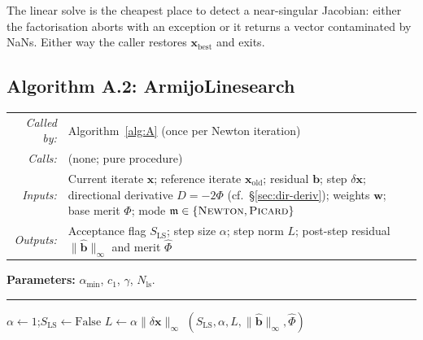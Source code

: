 \documentclass{article}
\makeatletter
\newcommand{\moduleinterface}[4]{%
\begin{interfacecard}
\footnotesize
\begin{tabular}{@{}r@{\quad}p{0.82\textwidth}@{}}
\textit{Called by:} & #1 \\
\textit{Calls:}     & #2 \\
\textit{Inputs:}    & #3 \\
\textit{Outputs:}   & #4 \\
\end{tabular}
\end{interfacecard}
}
\makeatother
\begin{document}
The linear solve is the cheapest place to detect a near-singular
Jacobian: either the factorisation aborts with an exception or it
returns a vector contaminated by NaNs. Either way the caller restores
$\boldsymbol{x}_{\mathrm{best}}$ and exits.

\subsection{Algorithm A.2: ArmijoLinesearch}

\moduleinterface
    {Algorithm~\ref{alg:A} (once per Newton iteration)}
    {(none; pure procedure)}
    {Current iterate $\boldsymbol{x}$; reference iterate $\boldsymbol{x}_{\mathrm{old}}$; residual $\boldsymbol{b}$; step $\delta\boldsymbol{x}$; directional derivative $D = -2\Phi$ (cf.\ §\ref{sec:dir-deriv}); weights $\boldsymbol{w}$; base merit $\Phi$; mode $\mathfrak{m} \in \{\textsc{Newton}, \textsc{Picard}\}$}
    {Acceptance flag $S_{\mathrm{LS}}$; step size $\alpha$; step norm $L$; post-step residual $\|\hat{\boldsymbol{b}}\|_\infty$ and merit $\hat\Phi$}

\begin{algorithm}[H]
\caption{$\mathrm{ArmijoLinesearch}$.}
\label{alg:A2}
\SetAlgoLined
\textbf{Parameters:} $\alpha_{\min}$, $c_1$, $\gamma$, $N_{\mathrm{ls}}$.\\
\vspace{0.2cm}\hrule\vspace{0.2cm}
$\alpha \gets 1$;\quad $S_{\mathrm{LS}} \gets \mathrm{False}$\;
$L \gets \alpha \|\delta\boldsymbol{x}\|_\infty$\;
\Return $(S_{\mathrm{LS}}, \alpha, L, \|\hat{\boldsymbol{b}}\|_\infty, \hat\Phi)$\;
\end{algorithm}
\end{document}
